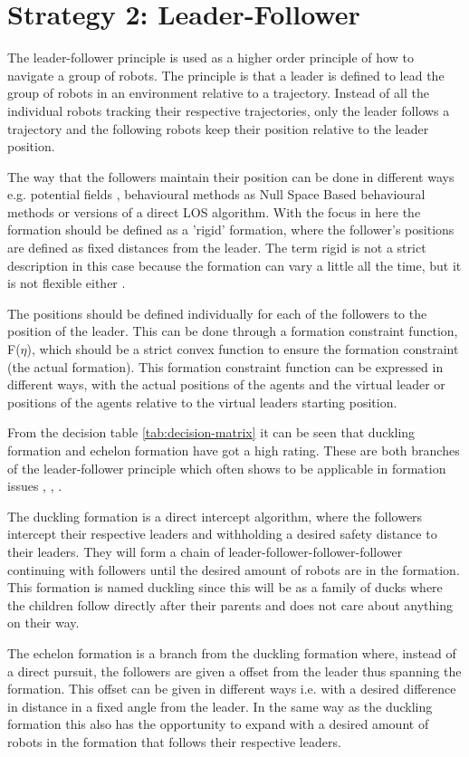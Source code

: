\section{Strategy 2: Leader-Follower}

The leader-follower principle is used as a higher order principle of how to navigate a group of robots. The principle is that a leader is defined to lead the group of robots in an environment relative to a trajectory. Instead of all the individual robots tracking their respective trajectories, only the leader follows a trajectory and the following robots keep their position relative to the leader position.

The way that the followers maintain their position can be done in different ways e.g. potential fields \citep{pfmrm}, behavioural methods as Null Space Based behavioural methods \citep{arrichiello2006formation} or versions of a direct \ac{LOS} algorithm. With the focus in here the formation should be defined as a 'rigid' formation, where the follower's positions are defined as fixed distances from the leader. The term rigid is not a strict description in this case because the formation can vary a little all the time, but it is not flexible either \citep{976029}.

The positions should be defined individually for each of the followers to the position of the leader. This can be done through a formation constraint function, F($\eta$), which should be a strict convex function to ensure the formation constraint (the actual formation). This formation constraint function can be expressed in different ways, with the actual positions of the agents and the virtual leader or positions of the agents relative to the virtual leaders starting position.

From the decision table \ref{tab:decision-matrix} it can be seen that duckling formation and echelon formation have got a high rating. These are both branches of the leader-follower principle which often shows to be applicable in formation issues \citep{TKP04}, \citep{1013687}, \citep{976029}.

The duckling formation is a direct intercept algorithm, where the followers intercept their respective leaders and withholding a desired safety distance to their leaders. They will form a chain of leader-follower-follower-follower continuing with followers until the desired amount of robots are in the formation. This formation is named duckling since this will be as a family of ducks where the children follow directly after their parents and does not care about anything on their way.

The echelon formation is a branch from the duckling formation where, instead of a direct pursuit, the followers are given a offset from the leader thus spanning the formation. This offset can be given in different ways i.e. with a desired difference in distance in a fixed angle from the leader. In the same way as the duckling formation this also has the opportunity to expand with a desired amount of robots in the formation that follows their respective leaders.
